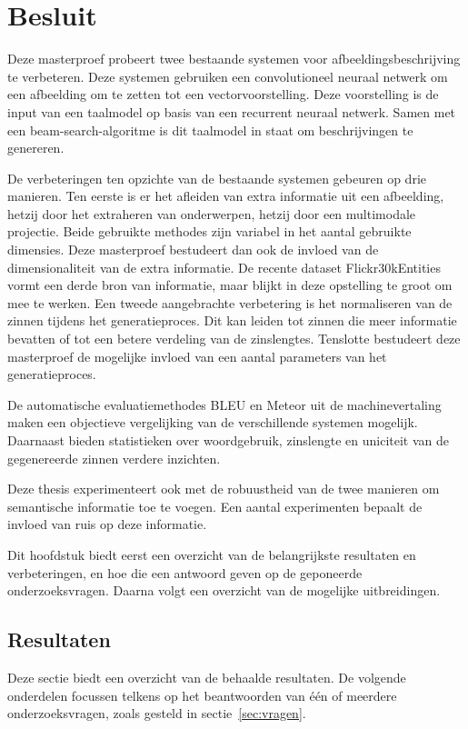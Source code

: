 \chapter{Besluit}
\label{besluit}
Deze masterproef probeert twee bestaande systemen voor afbeeldingsbeschrijving te verbeteren. Deze systemen gebruiken een convolutioneel neuraal netwerk om een afbeelding om te zetten tot een vectorvoorstelling. Deze voorstelling is de input van een taalmodel op basis van een recurrent neuraal netwerk. Samen met een beam-search-algoritme is dit taalmodel in staat om beschrijvingen te genereren.

De verbeteringen ten opzichte van de bestaande systemen gebeuren op drie manieren. Ten eerste is er het afleiden van extra informatie uit een afbeelding, hetzij door het extraheren van onderwerpen, hetzij door een multimodale projectie. Beide gebruikte methodes zijn variabel in het aantal gebruikte dimensies. Deze masterproef bestudeert dan ook de invloed van de dimensionaliteit van de extra informatie. 
De recente dataset Flickr30kEntities vormt een derde bron van informatie, maar blijkt in deze opstelling te groot om mee te werken.
Een tweede aangebrachte verbetering is het normaliseren van de zinnen tijdens het generatieproces. Dit kan leiden tot zinnen die meer informatie bevatten of tot een betere verdeling van de zinslengtes. Tenslotte bestudeert deze masterproef de mogelijke invloed van een aantal parameters van het generatieproces.

De automatische evaluatiemethodes BLEU en Meteor uit de machinevertaling maken een objectieve vergelijking van de verschillende systemen mogelijk. Daarnaast bieden statistieken over woordgebruik, zinslengte en uniciteit van de gegenereerde zinnen verdere inzichten.

Deze thesis experimenteert ook met de robuustheid van de twee manieren om semantische informatie toe te voegen. Een aantal experimenten bepaalt de invloed van ruis op deze informatie.

Dit hoofdstuk biedt eerst een overzicht van de belangrijkste resultaten en verbeteringen, en hoe die een antwoord geven op de geponeerde onderzoeksvragen. Daarna volgt een overzicht van de mogelijke uitbreidingen.
\section{Resultaten}
Deze sectie biedt een overzicht van de behaalde resultaten. De volgende onderdelen focussen telkens op het beantwoorden van \'e\'en of meerdere onderzoeksvragen, zoals gesteld in sectie~\ref{sec:vragen}.
